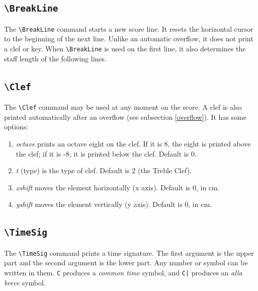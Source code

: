 \documentclass[final]{article}
\begin{document}
	\subsection{\texttt{\textbackslash BreakLine}}
	The \verb|\BreakLine| command starts a new score line. It resets the horizontal cursor to the beginning of the next line. Unlike an automatic overflow, it does not print a clef or key. When \verb|\BreakLine| is used on the first line, it also determines the staff length of the following lines.
	
	
	\subsection{\texttt{\textbackslash Clef}}
	The \verb|\Clef| command may be used at any moment on the score. A clef is also printed automatically after an overflow (see subsection \ref{overflow}). It has some options:
	\begin{enumerate}[-]
		\item \textsl{octave} prints an octave eight on the clef. If it is 8, the eight is printed above the clef; if it is -8, it is printed below the clef. Default is 0.
		\item \textsl{t} (type) is the type of clef. Default is 2 (the Treble Clef).
		\item \textsl{xshift} moves the element horizontally (x axis). Default is 0, in cm.
		\item \textsl{yshift} moves the element vertically (y axis). Default is 0, in cm.
	\end{enumerate}
	\begin{center}
		\begin{mousik}
			\Clef[t=1]
			\Clef[t=2]
			\Clef[t=3]
			\Clef[t=4]
			\Clef[t=11]
			\Clef[t=12]
			\Clef[t=13]
			\Clef[t=14]
			\Clef[t=15]
			\Clef[t=0]
			\Barline[t=|.]
		\end{mousik}
	\end{center}

	\subsection{\texttt{\textbackslash TimeSig}}
	The \verb|\TimeSig| command prints a time signature. The first argument is the upper part and the second argument is the lower part. Any number or symbol can be written in them. \texttt{C} produces a \textit{common time} symbol, and \texttt{C|} produces an \textit{alla breve} symbol.
	
\end{document}
